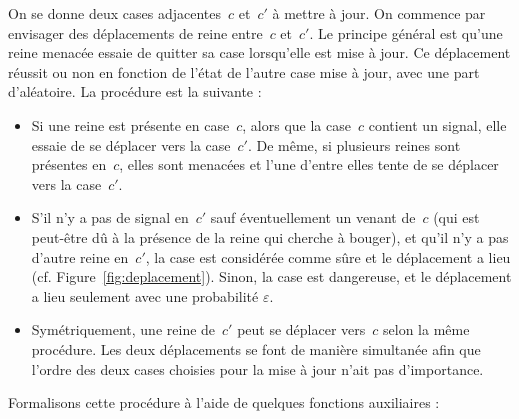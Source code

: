 On se donne  deux cases adjacentes~$c$ et~$c'$ à mettre à  jour. On commence par
envisager des déplacements  de reine entre~$c$ et~$c'$. Le  principe général est
qu'une reine menacée  essaie de quitter sa case lorsqu'elle est  mise à jour. Ce
déplacement réussit  ou non en fonction de  l'état de l'autre case  mise à jour,
avec une part d'aléatoire. 
La procédure est la suivante :
\begin{itemize}
\item Si une reine est présente en case~$c$, alors que la case~$c$ contient un signal, elle essaie de se déplacer vers la case~$c'$. De même, si plusieurs reines sont présentes en~$c$, elles sont menacées et l'une d'entre elles tente de se déplacer vers la case~$c'$.
\item S'il n'y a pas de signal en~$c'$ sauf éventuellement un venant de~$c$ (qui est peut-être dû à la présence de la reine qui cherche à bouger), et qu'il n'y a pas d'autre reine en~$c'$, la case est considérée comme sûre et le déplacement a lieu (cf. Figure~\ref{fig:deplacement}). Sinon, la case est dangereuse, et le déplacement a lieu seulement avec une probabilité $\varepsilon$.
\item Symétriquement, une reine de~$c'$ peut se déplacer vers~$c$ selon la même procédure. Les deux déplacements se font de manière simultanée afin que l'ordre des deux cases choisies pour la mise à jour n'ait pas d'importance.
\end{itemize}



Formalisons cette procédure à l'aide de quelques fonctions auxiliaires :  

